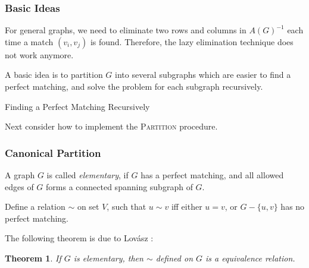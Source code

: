 \documentclass[a4paper]{article}
\newtheorem{theorem}{\hspace{2em}Theorem}
\begin{document}
			\subsubsection{Basic Ideas}

				\hspace{2em}For general graphs, we need to eliminate two rows and columns in $A(G)^{-1}$ each time a match $(v_i, v_j)$ is found. Therefore, the lazy elimination technique does not work anymore.

				A basic idea is to partition $G$ into several subgraphs which are easier to find a perfect matching, and solve the problem for each subgraph recursively.

				\begin{algorithm}
					\caption{Finding a Perfect Matching Recursively}

					\begin{algorithmic}[1]
							\Else
							\EndIf
						\EndFunction
					\end{algorithmic}
				\end{algorithm}

				Next consider how to implement the \textsc{Partition} procedure.
			
			\subsubsection{Canonical Partition}
				
				\hspace{2em}A graph $G$ is called \emph{elementary}, if $G$ has a perfect matching, and all allowed edges of $G$ forms a connected spanning subgraph of $G$.

				Define a relation $\sim$ on set $V$, such that $u \sim v$ iff either $u = v$, or $G - \{u, v\}$ has no perfect matching.
				
				The following theorem is due to Lov\'asz \cite{lovasz} :

				\begin{theorem}
					If $G$ is elementary, then $\sim$ defined on $G$ is a equivalence relation.
				\end{theorem}
\end{document}
